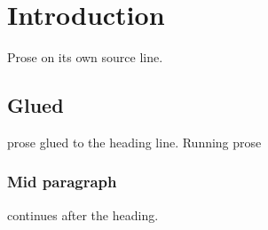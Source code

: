 \section{Introduction}

Prose on its own source line.

\subsection{Glued}

prose glued to the heading line. Running prose

\subsubsection{Mid paragraph}

continues after the heading.
